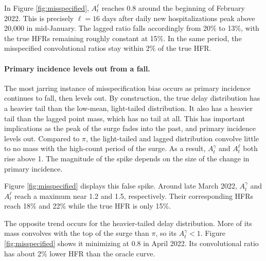 \documentclass{article}
\begin{document}
In Figure \ref{fig:misspecified}, $A_t^\ell$ reaches 0.8 around the beginning of February 2022. This is precisely $\ell=16$ days after daily new hospitalizations peak above 20,000 in mid-January. The lagged ratio falls accordingly from 20\% to 13\%, with the true HFRs remaining roughly constant at 15\%. In the same period, the misspecified convolutional ratios stay within 2\% of the true HFR.

\paragraph{Primary incidence levels out from a fall.}
The most jarring instance of misspecification bias occurs as primary incidence continues to fall, then levels out. By construction, the true delay distribution has a heavier tail than the low-mean, light-tailed distribution. It also has a heavier tail than the lagged point mass, which has no tail at all. This has important implications as the peak of the surge fades into the past, and primary incidence levels out. Compared to $\pi$, the light-tailed and lagged distribution convolve little to no mass with the high-count period of the surge. As a result, $A_t^\gamma$ and $A_t^\ell$ both rise above 1. The magnitude of the spike depends on the size of the change in primary incidence.

Figure \ref{fig:misspecified} displays this false spike. Around late March 2022, $A_t^\gamma$ and $A_t^\ell$ reach a maximum near 1.2 and 1.5, respectively. Their corresponding HFRs reach 18\% and 22\% while the true HFR is only 15\%. 

The opposite trend occurs for the heavier-tailed delay distribution. More of its mass convolves with the top of the surge than $\pi$, so its $A_t^\gamma<1$. Figure \ref{fig:misspecified} shows it minimizing at 0.8 in April 2022. Its convolutional ratio has about 2\% lower HFR than the oracle curve.

\paragraph{}
\end{document}
